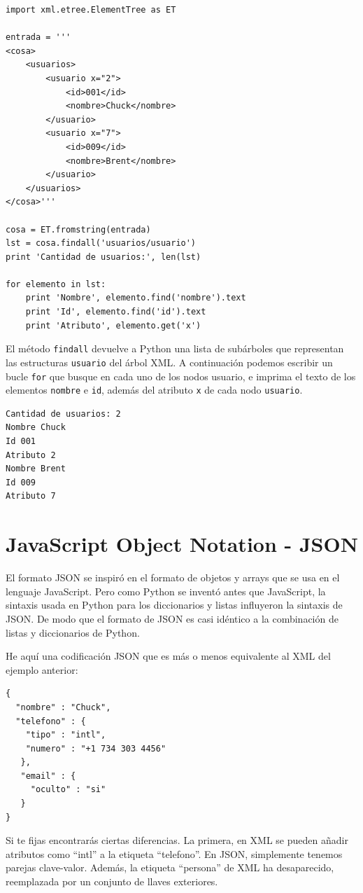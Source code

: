 \beforeverb
\begin{verbatim}
import xml.etree.ElementTree as ET

entrada = '''
<cosa>
    <usuarios>
        <usuario x="2">
            <id>001</id>
            <nombre>Chuck</nombre>
        </usuario>
        <usuario x="7">
            <id>009</id>
            <nombre>Brent</nombre>
        </usuario>
    </usuarios>
</cosa>'''

cosa = ET.fromstring(entrada)
lst = cosa.findall('usuarios/usuario')
print 'Cantidad de usuarios:', len(lst)

for elemento in lst:
    print 'Nombre', elemento.find('nombre').text
    print 'Id', elemento.find('id').text
    print 'Atributo', elemento.get('x')
\end{verbatim}
\afterverb
%
El método {\tt findall} devuelve a Python una lista de subárboles que
representan las estructuras {\tt usuario} del árbol XML. A continuación podemos
escribir un bucle {\tt for} que busque en cada uno de los nodos usuario,
e imprima el texto de los elementos {\tt nombre} e {\tt id}, además del
atributo {\tt x} de cada nodo {\tt usuario}.

\beforeverb
\begin{verbatim}
Cantidad de usuarios: 2
Nombre Chuck
Id 001
Atributo 2
Nombre Brent
Id 009
Atributo 7
\end{verbatim}
\afterverb
%

\section{JavaScript Object Notation - JSON}

El formato JSON se inspiró en el formato de objetos y arrays que se usa en el lenguaje
JavaScript. Pero como Python se inventó antes que JavaScript, la sintaxis usada en Python
para los diccionarios y listas influyeron la sintaxis de JSON. De modo que el formato
de JSON es casi idéntico a la combinación de listas y diccionarios de Python.

He aquí una codificación JSON que es más o menos equivalente al XML del ejemplo anterior:

\beforeverb
\begin{verbatim}
{
  "nombre" : "Chuck",
  "telefono" : {
    "tipo" : "intl",
    "numero" : "+1 734 303 4456"
   },
   "email" : {
     "oculto" : "si"
   }
}
\end{verbatim}
\afterverb
%
Si te fijas encontrarás ciertas diferencias. La primera, en XML se pueden añadir atributos como
``intl'' a la etiqueta ``telefono''. En JSON, simplemente tenemos parejas clave-valor.
Además, la etiqueta ``persona'' de XML ha desaparecido, reemplazada por un conjunto
de llaves exteriores.

